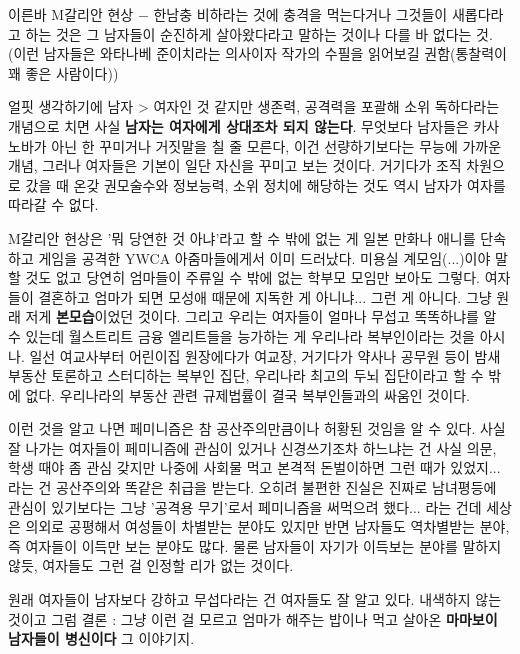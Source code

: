 이른바 M갈리안 현상 $-$ 한남충 비하라는 것에 충격을 먹는다거나
그것들이 새롭다라고 하는 것은 그 남자들이 순진하게 살아왔다라고 말하는 것이나 다를 바 없다는 것.
(이런 남자들은 와타나베 준이치라는 의사이자 작가의 수필을 읽어보길 권함(통찰력이 꽤 좋은 사람이다))
\vspace{5mm}

얼핏 생각하기에 남자 > 여자인 것 같지만
생존력, 공격력을 포괄해 소위 독하다라는 개념으로 치면 사실 \textbf{남자는 여자에게 상대조차 되지 않는다}.
무엇보다 남자들은 카사노바가 아닌 한 꾸미거나 거짓말을 칠 줄 모른다, 이건 선량하기보다는 무능에 가까운 개념,
그러나 여자들은 기본이 일단 자신을 꾸미고 보는 것이다.
거기다가 조직 차원으로 갔을 때 온갖 권모술수와 정보능력, 소위 정치에 해당하는 것도 역시 남자가 여자를 따라갈 수 없다.
\vspace{5mm}

M갈리안 현상은 '뭐 당연한 것 아냐'라고 할 수 밖에 없는 게
일본 만화나 애니를 단속하고 게임을 공격한 YWCA 아줌마들에게서 이미 드러났다.
미용실 계모임(...)이야 말할 것도 없고 당연히 엄마들이 주류일 수 밖에 없는 학부모 모임만 보아도 그렇다.
여자들이 결혼하고 엄마가 되면 모성애 때문에 지독한 게 아니냐... 그런 게 아니다.
그냥 원래 저게 \textbf{본모습}이었던 것이다.
그리고 우리는 여자들이 얼마나 무섭고 똑똑하냐를 알 수 있는데
월스트리트 금융 엘리트들을 능가하는 게 우리나라 복부인이라는 것을 아시나.
일선 여교사부터 어린이집 원장에다가 여교장, 거기다가 약사나 공무원 등이 밤새 부동산 토론하고 스터디하는 복부인 집단,
우리나라 최고의 두뇌 집단이라고 할 수 밖에 없다.
우리나라의 부동산 관련 규제법률이 결국 복부인들과의 싸움인 것이다.
\vspace{5mm}

이런 것을 알고 나면 페미니즘은 참 공산주의만큼이나 허황된 것임을 알 수 있다.
사실 잘 나가는 여자들이 페미니즘에 관심이 있거나 신경쓰기조차 하느냐는 건 사실 의문,
학생 때야 좀 관심 갖지만 나중에 사회물 먹고 본격적 돈벌이하면 그런 때가 있었지... 라는 건 공산주의와 똑같은 취급을 받는다.
오히려 불편한 진실은 진짜로 남녀평등에 관심이 있기보다는 그냥 '공격용 무기'로서 페미니즘을 써먹으려 했다... 라는 건데
세상은 의외로 공평해서 여성들이 차별받는 분야도 있지만 반면 남자들도 역차별받는 분야, 즉 여자들이 이득만 보는 분야도 많다.
물론 남자들이 자기가 이득보는 분야를 말하지 않듯, 여자들도 그런 걸 인정할 리가 없는 것이다.
\vspace{5mm}

원래 여자들이 남자보다 강하고 무섭다라는 건 여자들도 잘 알고 있다. 내색하지 않는 것이고
그럼 결론 : 그냥 이런 걸 모르고 엄마가 해주는 밥이나 먹고 살아온 \textbf{마마보이 남자들이 병신이다} 그 이야기지.
\vspace{5mm}

